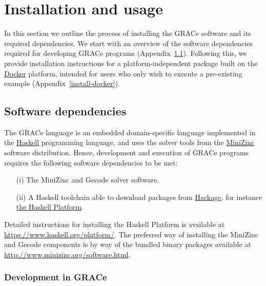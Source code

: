
\section{Installation and usage}
\label{appendix-install}
%
In this section we outline the process of installing the GRACe software and its
required dependencies. We start with an overview of the software dependencies
required for developing GRACe programs (Appendix~\ref{install-overview}).
Following this, we provide installation instructions for a platform-independent
package built on the \href{https://www.docker.com/}{Docker} platform, intended
for users who only wish to execute a pre-existing example
(Appendix~\ref{install-docker}).


\subsection{Software dependencies}
\label{install-overview}
%
The GRACe language is an embedded domain-specific language implemented in the
\href{https://www.haskell.org/}{Haskell} programming language, and uses the
solver tools from the \href{http://www.minizinc.org/}{MiniZinc} software
distribution. Hence, development and execution of GRACe programs requires the
following software dependencies to be met:
%
\begin{itemize}
  \item[(i)] The MiniZinc and Gecode solver software.
  \item[(ii)] A Haskell toolchain able to download packages from
    \href{https://hackage.haskell.org/}{Hackage}, for instance
    \href{https://www.haskell.org/platform/}{the Haskell Platform}.
\end{itemize}

Detailed instructions for installing the Haskell Platform is available at
\url{https://www.haskell.org/platform/}. The preferred way of installing the
MiniZinc and Gecode components is by way of the bundled binary packages
available at \url{http://www.minizinc.org/software.html}.

\subsubsection{Development in GRACe}

